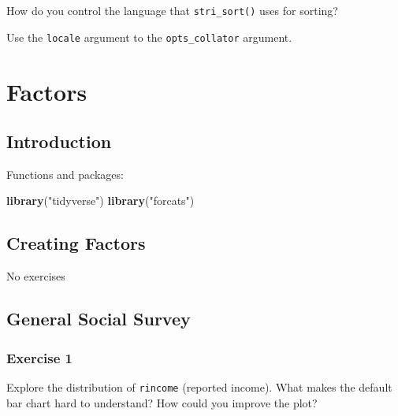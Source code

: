 \documentclass[]{book}
\newenvironment{Shaded}{\begin{snugshade}}{\end{snugshade}}
\newcommand{\KeywordTok}[1]{\textcolor[rgb]{0.13,0.29,0.53}{\textbf{#1}}}
\newcommand{\NormalTok}[1]{#1}
\newcommand{\OperatorTok}[1]{\textcolor[rgb]{0.81,0.36,0.00}{\textbf{#1}}}
\newcommand{\StringTok}[1]{\textcolor[rgb]{0.31,0.60,0.02}{#1}}
\theoremstyle{definition}
\theoremstyle{definition}
\theoremstyle{definition}
\theoremstyle{remark}
\begin{document}
How do you control the language that \texttt{stri\_sort()} uses for
sorting?

Use the \texttt{locale} argument to the \texttt{opts\_collator}
argument.

\hypertarget{factors}{%
\chapter{Factors}\label{factors}}

\hypertarget{introduction-9}{%
\section{Introduction}\label{introduction-9}}

Functions and packages:

\begin{Shaded}
\begin{Highlighting}[]
\KeywordTok{library}\NormalTok{(}\StringTok{"tidyverse"}\NormalTok{)}
\KeywordTok{library}\NormalTok{(}\StringTok{"forcats"}\NormalTok{)}
\end{Highlighting}
\end{Shaded}

\hypertarget{creating-factors}{%
\section{Creating Factors}\label{creating-factors}}

No exercises

\hypertarget{general-social-survey}{%
\section{General Social Survey}\label{general-social-survey}}

\hypertarget{exercise-1-38}{%
\subsection{Exercise 1}\label{exercise-1-38}}

Explore the distribution of \texttt{rincome} (reported income). What
makes the default bar chart hard to understand? How could you improve
the plot?

\begin{Shaded}
\end{Shaded}
\end{document}
